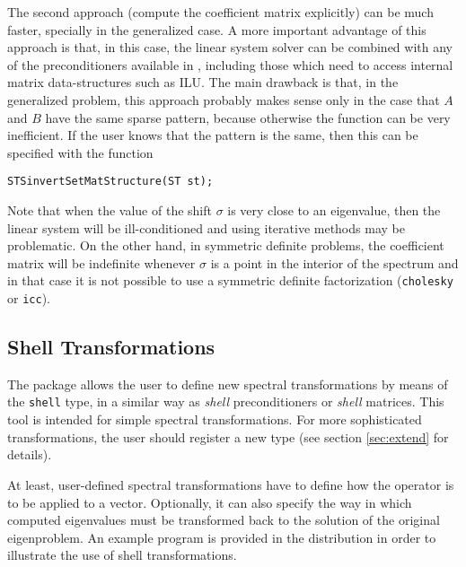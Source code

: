 	The second approach (compute the coefficient matrix explicitly) can be much faster, specially in the generalized case. A more important advantage of this approach is that, in this case, the linear system solver can be combined with any of the preconditioners available in \petsc, including those which need to access internal matrix data-structures such as ILU. The main drawback is that, in the generalized problem, this approach probably makes sense only in the case that $A$ and $B$ have the same sparse pattern, because otherwise the function  can be very inefficient. 
If the user knows that the pattern is the same, then this can be specified with the function
	\begin{Verbatim}[fontsize=\small]
	STSinvertSetMatStructure(ST st);
	\end{Verbatim}
	
	Note that when the value of the shift $\sigma$ is very close to an eigenvalue, then the linear system will be ill-conditioned and using iterative methods may be problematic. On the other hand, in symmetric definite problems, the coefficient matrix will be indefinite whenever $\sigma$ is a point in the interior of the spectrum and in that case it is not possible to use a symmetric definite factorization (\texttt{cholesky} or \texttt{icc}).

\subsection{Shell Transformations}
\label{sec:shell}

	The  package allows the user to define new spectral transformations by means of the \texttt{shell} type, in a similar way as \emph{shell} preconditioners or \emph{shell} matrices. This tool is intended for simple spectral transformations. For more sophisticated transformations, the user should register a new  type (see section \ref{sec:extend} for details).

	At least, user-defined spectral transformations have to define how the operator is to be applied to a vector. Optionally, it can also specify the way in which computed eigenvalues must be transformed back to the solution of the original eigenproblem. An example program is provided in the \slepc distribution in order to illustrate the use of shell transformations.

